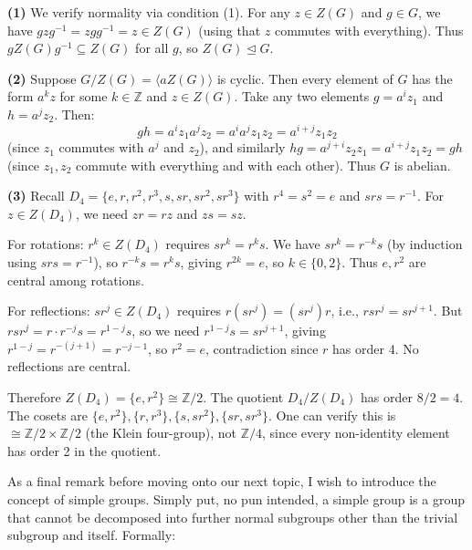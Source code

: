 \documentclass{report}
\begin{document}
\begin{solution}
\textbf{(1)} We verify normality via condition (1). For any \(z \in Z(G)\) and \(g \in G\), we have \(gzg^{-1} = zgg^{-1} = z \in Z(G)\) (using that \(z\) commutes with everything). Thus \(gZ(G)g^{-1} \subseteq Z(G)\) for all \(g\), so \(Z(G) \trianglelefteq G\).

\textbf{(2)} Suppose \(G/Z(G) = \langle aZ(G) \rangle\) is cyclic. Then every element of \(G\) has the form \(a^k z\) for some \(k \in \mathbb{Z}\) and \(z \in Z(G)\). Take any two elements \(g = a^i z_1\) and \(h = a^j z_2\). Then:
\[gh = a^i z_1 a^j z_2 = a^i a^j z_1 z_2 = a^{i+j} z_1 z_2\]
(since \(z_1\) commutes with \(a^j\) and \(z_2\)), and similarly \(hg = a^{j+i} z_2 z_1 = a^{i+j} z_1 z_2 = gh\) (since \(z_1, z_2\) commute with everything and with each other). Thus \(G\) is abelian.

\textbf{(3)} Recall \(D_4 = \{e, r, r^2, r^3, s, sr, sr^2, sr^3\}\) with \(r^4 = s^2 = e\) and \(srs = r^{-1}\). For \(z \in Z(D_4)\), we need \(zr = rz\) and \(zs = sz\). 

For rotations: \(r^k \in Z(D_4)\) requires \(sr^k = r^ks\). We have \(sr^k = r^{-k}s\) (by induction using \(srs = r^{-1}\)), so \(r^{-k}s = r^ks\), giving \(r^{2k} = e\), so \(k \in \{0, 2\}\). Thus \(e, r^2\) are central among rotations.

For reflections: \(sr^j \in Z(D_4)\) requires \(r(sr^j) = (sr^j)r\), i.e., \(rsr^j = sr^{j+1}\). But \(rsr^j = r \cdot r^{-j}s = r^{1-j}s\), so we need \(r^{1-j}s = sr^{j+1}\), giving \(r^{1-j} = r^{-(j+1)} = r^{-j-1}\), so \(r^{2} = e\), contradiction since \(r\) has order 4. No reflections are central.

Therefore \(Z(D_4) = \{e, r^2\} \cong \mathbb{Z}/2\). The quotient \(D_4/Z(D_4)\) has order \(8/2 = 4\). The cosets are \(\{e, r^2\}, \{r, r^3\}, \{s, sr^2\}, \{sr, sr^3\}\). One can verify this is \(\cong \mathbb{Z}/2 \times \mathbb{Z}/2\) (the Klein four-group), not \(\mathbb{Z}/4\), since every non-identity element has order 2 in the quotient.
\end{solution}

As a final remark before moving onto our next topic, I wish to introduce the concept of simple groups. Simply put, no pun intended, a simple group is a group that cannot be decomposed into further normal subgroups other than the trivial subgroup and itself. Formally:

\end{document}
